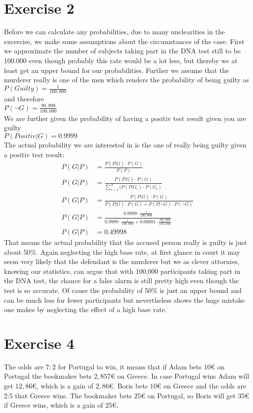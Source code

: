 \def \TutorialSheetNumber{3}


\section*{Exercise 2}
Before we can calculate any probabilities, due to many unclearities in the excercise, we make some assumptions about the circumstances of the case. First we approximate the number of subjects taking part in the DNA test still to be 100.000 even though probably this rate would be a lot less, but thereby we at least get an upper bound for our probabilities. Further we assume that the murderer really is one of the men which renders the probability of being guilty as \\ 
$P(Guilty) = \frac{1}{100,000}$\\
and therefore\\
$P(\neg G) = \frac{99,999}{100,000}$\\
We are further given the probability of having a positiv test result given you are guilty \\
$P(Positiv|G) = 0.9999 $ \\
The actual probability we are interested in is the one of really being guilty given a positiv test result:
\begin{align*}
  P(G | P) & = \frac{P(P|G) \cdot P(G)}{P(P)} \\
  P(G | P) & = \frac{P(P|G) \cdot P(G)}{\sum\limits_{i=1}^{N}(P(P|G_i)\cdot P(G_i)}\\
  P(G | P) & = \frac{P(P|G) \cdot P(G)}{P(P|G)\cdot P(G) + P(P|\neg G)\cdot P(\neg G)} \\
  P(G | P) & = \frac{0.9999 \cdot \frac{1}{100,000}}{0.9999 \cdot \frac{1}{100,000} + 0.00001 \cdot \frac{99,999}{100,000}}\\
  P(G | P) & = 0.49998
\end{align*}
 That means the actual probability that the accused person really is guilty is just about 50\%. Again neglecting the high base rate, at first glance in court  it may seem very likely that the defendant is the murderer but we as clever attornies, knowing our statistics, can argue that with 100,000 participants taking part in the DNA test, the chance for a false alarm is still pretty high even though the test is so accurate. Of cause the probability of 50\% is just an upper bound and can be much less for fewer participants but nevertheless shows the huge mistake one makes by neglecting the effect of a high base rate.  
\section*{Exercise 4}
The odds are $7 : 2$ for Portugal to win, it means that if Adam bets $10\euro$ on Portugal the bookmaker bets $2,857€$ on Greece. In case Portugal wins Adam will get $12,86€$, which is a gain of $2,86€$.
Boris bets $10€$ on Greece and the odds are 2:5 that Greece wins. The bookmaker bets $25€$ on Portugal, so Boris will get $35€$ if Greece wins, which is a gain of $25€$.

